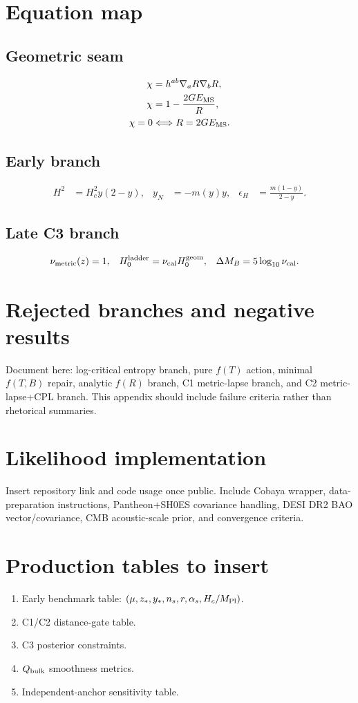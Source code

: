 \documentclass[11pt]{article}
\newcommand{\mpl}{M_{\rm Pl}}
\begin{document}
\appendix
\section{Equation map}
\subsection{Geometric seam}
\begin{align}
\chi&=h^{ab}\nabla_aR\nabla_bR,\\
\chi&=1-\frac{2GE_{\rm MS}}{R},\\
\chi=0&\Longleftrightarrow R=2GE_{\rm MS}.
\end{align}

\subsection{Early branch}
\begin{align}
H^2&=H_c^2y(2-y),& y_N&=-m(y)y,& \epsilon_H&=\frac{m(1-y)}{2-y}.
\end{align}

\subsection{Late C3 branch}
\begin{align}
\nu_{\rm metric}(z)&=1,& H_0^{\rm ladder}&=\nu_{\rm cal}H_0^{\rm geom},& \Delta M_B&=5\log_{10}\nu_{\rm cal}.
\end{align}

\section{Rejected branches and negative results}
Document here: log-critical entropy branch, pure $f(T)$ action, minimal $f(T,B)$ repair, analytic $f(R)$ branch, C1 metric-lapse branch, and C2 metric-lapse+CPL branch. This appendix should include failure criteria rather than rhetorical summaries.

\section{Likelihood implementation}
Insert repository link and code usage once public. Include Cobaya wrapper, data-preparation instructions, Pantheon+SH0ES covariance handling, DESI DR2 BAO vector/covariance, CMB acoustic-scale prior, and convergence criteria.

\section{Production tables to insert}
\begin{enumerate}
\item Early benchmark table: $(\mu,z_*,y_*,n_s,r,\alpha_s,H_c/\mpl)$.
\item C1/C2 distance-gate table.
\item C3 posterior constraints.
\item $Q_{\rm bulk}$ smoothness metrics.
\item Independent-anchor sensitivity table.
\end{enumerate}
\end{document}
